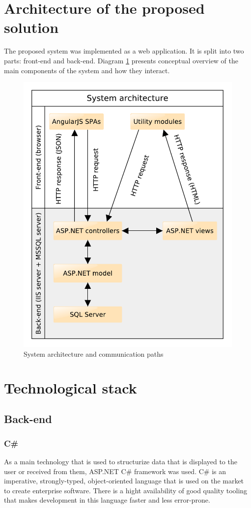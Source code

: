 \documentclass[12pt, twoside, openany]{report}
\theoremstyle{definition}
\begin{document}
\section{Architecture of the proposed solution}
The proposed system was implemented as a web application. It is split into two parts: front-end and back-end. Diagram \ref{fig:architecture-diagram} presents conceptual overview of the main components of the system and how they interact.
\begin{figure}
	\centering
	\includegraphics[width=0.7\linewidth, trim={0 0cm 0cm 0cm},clip]{architecture}
	\caption{System architecture and communication paths
		\label{fig:architecture-diagram}
	}
\end{figure}
\section{Technological stack}

\subsection{Back-end}
\subsubsection{C\#}
As a main technology that is used to structurize data that is displayed to the user or received from them, ASP.NET  C\# framework was used.
C\# is an imperative, strongly-typed, object-oriented language that is used on the market to create enterprise software. There is a hight availability of good quality tooling that makes development in this language faster and less error-prone.
\end{document}

